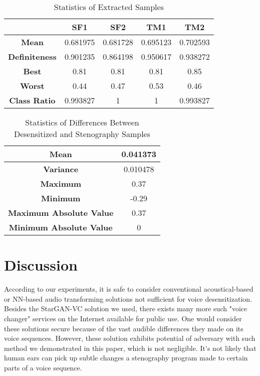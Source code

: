 \documentclass[journal]{IEEEtran} %
\begin{document}
\begin{CJK*}{UTF8}{gbsn}
\begin{table}[htbp]
    \centering
    \caption{Statistics of Extracted Samples}
    \begin{tabular}{|c|c|c|c|c|}
        \hline
        & \textbf{SF1} & \textbf{SF2} & \textbf{TM1} & \textbf{TM2} \\
        \hline
        \textbf{Mean} & 0.681975 & 0.681728 & 0.695123 & 0.702593 \\
        \hline
        \textbf{Definiteness} & 0.901235 & 0.864198 & 0.950617 & 0.938272 \\
        \hline
        \textbf{Best} & 0.81 & 0.81 & 0.81 & 0.85 \\
        \hline
        \textbf{Worst} & 0.44 & 0.47 & 0.53 & 0.46 \\
        \hline
        \textbf{Class Ratio} & 0.993827 & 1 & 1 & 0.993827 \\
        \hline
    \end{tabular}
    \label{tab:st_rec}
\end{table}

\begin{table}[htbp]
    \centering
    \caption{Statistics of Differences Between Desensitized and Stenography Samples}
    \begin{tabular}{|c|c|}
        \hline
        \textbf{Mean} & 0.041373 \\
        \hline
        \textbf{Variance} & 0.010478 \\
        \hline
        \textbf{Maximum} & 0.37 \\
        \hline
        \textbf{Minimum} & -0.29 \\
        \hline
        \textbf{Maximum Absolute Value} & 0.37 \\
        \hline
        \textbf{Minimum Absolute Value} & 0 \\
        \hline
    \end{tabular}
\end{table}

\section{Discussion}

According to our experiments, it is safe to consider conventional acoustical-based or NN-based audio transforming solutions not sufficient for voice desensitization. Besides the StarGAN-VC solution we used, there exists many more such "voice changer" services on the Internet available for public use. One would consider these solutions secure because of the vast audible differences they made on its voice sequences. However, these solution exhibits potential of adversary with such method we demonstrated in this paper, which is not negligible. It's not likely that human ears can pick up subtle changes a stenography program made to certain parts of a voice sequence.


\end{CJK*}
\end{document}
